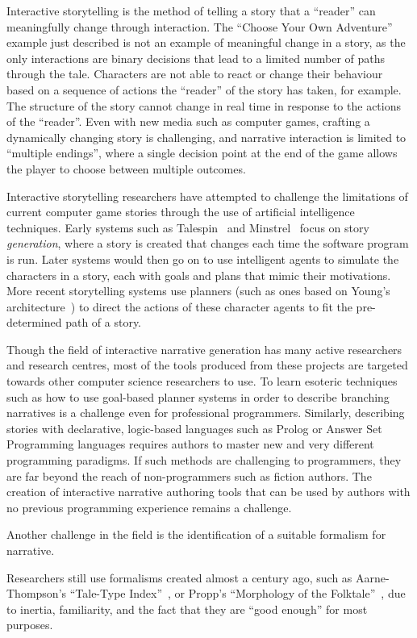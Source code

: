 \documentclass[11pt]{report}
\newcommand{\changed}[2]{%
  \todo[noline,bordercolor=white,color=yellow,size=\scriptsize]{#2}
  \cbcolor{yellow}
  \begin{changebar}
    #1
  \end{changebar}%
  }%
\newcommand{\changed}[2]{#1}
\begin{document}
Interactive storytelling is the method of telling a story
that a ``reader'' can meaningfully change through interaction. The ``Choose Your
Own Adventure'' example just described is not an example of meaningful change in
a story, as the only interactions are binary decisions that lead to a limited
number of paths through the tale. Characters are not able to react or change
their behaviour based on a sequence of actions the ``reader'' of the story has
taken, for example. The structure of the story cannot change in real time in
response to the
actions of the ``reader''. Even with new media such as computer games, crafting
a dynamically changing story is challenging, and narrative interaction is
limited to ``multiple endings'', where a single decision point at the end of the
game allows the player to choose between multiple outcomes.

Interactive storytelling researchers have attempted to challenge the limitations
of current computer game stories through the use of artificial intelligence
techniques. Early systems such as Talespin~\citep{meehan1977tale} and
Minstrel~\citep{turner1993minstrel} focus on story \emph{generation}, where a
story is created that changes each time the software program is run. Later
systems would then go on to use intelligent agents to simulate the characters
in a story, each with goals and plans that mimic their motivations. More recent
storytelling systems use planners (such as ones based on Young's
architecture~\citep{young2004architecture}) to direct the actions of these
character agents to fit the pre-determined path of a story.

Though the field of interactive narrative generation has many active researchers
and research centres, most of the tools produced from these projects are
targeted towards other computer science researchers to use. To learn esoteric
techniques such as how to use goal-based planner systems in order to describe
branching narratives is a challenge even for professional programmers.
Similarly, describing stories with declarative, logic-based languages such as
Prolog or Answer Set Programming languages requires authors to master new and
very different programming paradigms. If such methods are challenging to
programmers, they are far beyond the reach of non-programmers such as fiction
authors. The creation of interactive narrative authoring tools that can be used
by authors with no previous programming experience remains a challenge.

Another challenge in the field is the identification of a suitable formalism for
narrative. \changed{Researchers still use formalisms created almost a
century ago, such as Aarne-Thompson's ``Tale-Type
Index''~\citep{aarne1987types}, or Propp's ``Morphology of the
Folktale''~\citep{propp1968morphology}, due to inertia, familiarity, and the fact
that they are ``good enough'' for most purposes.}{Removed description of Propp
as a structuralist}
\end{document}
